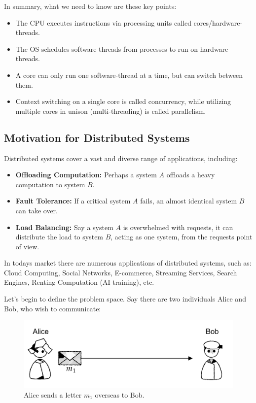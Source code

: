 \noindent
In summary, what we need to know are these key points:
\begin{itemize}
    \item The CPU executes instructions via processing units called cores/hardware-threads.
    \item The OS schedules software-threads from processes to run on hardware-threads.
    \item A core can only run one software-thread at a time, but can switch between them.
    \item Context switching on a single core is called concurrency, while utilizing multiple cores in unison (multi-threading) is called parallelism.
\end{itemize}


\newpage 

\noindent
\subsection{Motivation for Distributed Systems}

\noindent
Distributed systems cover a vast and diverse range of applications, including:
\begin{itemize}
    \item \textbf{Offloading Computation:} Perhaps a system $A$ offloads a heavy computation to system $B$.
    \item \textbf{Fault Tolerance:} If a critical system $A$ fails, an almost identical system $B$ can take over.
    \item \textbf{Load Balancing:} Say a system $A$ is overwhelmed with requests, it can distribute the load to system $B$, acting as 
    one system, from the requests point of view.
\end{itemize}
In todays market there are numerous applications of distributed systems, such as:
Cloud Computing, Social Networks, E-commerce, Streaming Services, Search Engines, Renting Computation (AI training), etc.

Let's begin to define the problem space. Say there are 
two individuals Alice and Bob, who wish to communicate:\\
\begin{figure}[h]
    \centering
    \includegraphics[width=.8\textwidth]{./Sections/high/com.png}
    \caption{Alice sends a letter $m_1$ overseas to Bob.}
\end{figure}

